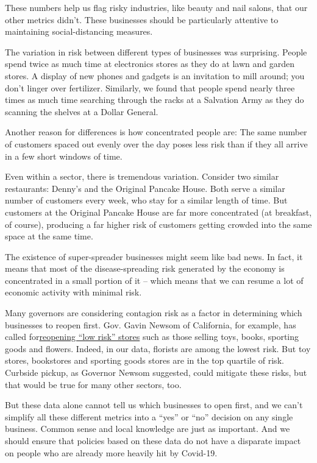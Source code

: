 These numbers help us flag risky industries, like beauty and nail
salons, that our other metrics didn't. These businesses should be
particularly attentive to maintaining social-distancing measures.

The variation in risk between different types of businesses was
surprising. People spend twice as much time at electronics stores as
they do at lawn and garden stores. A display of new phones and gadgets
is an invitation to mill around; you don't linger over fertilizer.
Similarly, we found that people spend nearly three times as much time
searching through the racks at a Salvation Army as they do scanning the
shelves at a Dollar General.

Another reason for differences is how concentrated people are: The same
number of customers spaced out evenly over the day poses less risk than
if they all arrive in a few short windows of time.

Even within a sector, there is tremendous variation. Consider two
similar restaurants: Denny's and the Original Pancake House. Both serve
a similar number of customers every week, who stay for a similar length
of time. But customers at the Original Pancake House are far more
concentrated (at breakfast, of course), producing a far higher risk of
customers getting crowded into the same space at the same time.

The existence of super-spreader businesses might seem like bad news. In
fact, it means that most of the disease-spreading risk generated by the
economy is concentrated in a small portion of it -- which means that we
can resume a lot of economic activity with minimal risk.

Many governors are considering contagion risk as a factor in determining
which businesses to reopen first. Gov. Gavin Newsom of California, for
example, has called
for\href{https://www.nytimes3xbfgragh.onion/reuters/2020/05/04/us/04reuters-health-coronavirus-california.html}{reopening
``low risk'' stores} such as those selling toys, books, sporting goods
and flowers. Indeed, in our data, florists are among the lowest risk.
But toy stores, bookstores and sporting goods stores are in the top
quartile of risk. Curbside pickup, as Governor Newsom suggested, could
mitigate these risks, but that would be true for many other sectors,
too.

But these data alone cannot tell us which businesses to open first, and
we can't simplify all these different metrics into a ``yes'' or ``no''
decision on any single business. Common sense and local knowledge are
just as important. And we should ensure that policies based on these
data do not have a disparate impact on people who are already more
heavily hit by Covid-19.

